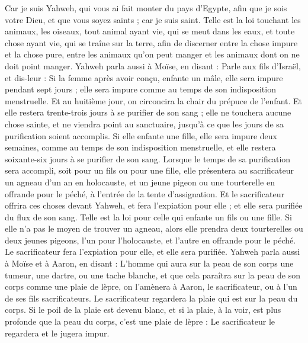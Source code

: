 \begin{multicols}{2}
Car je suis Yahweh, qui vous ai fait monter du pays d'Egypte, afin que je sois votre Dieu, et que vous soyez saints ; car je suis saint.
Telle est la loi touchant les animaux, les oiseaux, tout animal ayant vie, qui se meut dans les eaux, et toute chose ayant vie, qui se traîne sur la terre,
afin de discerner entre la chose impure et la chose pure, entre les animaux qu'on peut manger et les animaux dont on ne doit point manger.
\VerseOne{}Yahweh parla aussi à Moïse, en disant :
Parle aux fils d'Israël, et dis-leur : Si la femme après avoir conçu, enfante un mâle, elle sera impure pendant sept jours ; elle sera impure comme au temps de son indisposition menstruelle.
Et au huitième jour, on circoncira la chair du prépuce de l'enfant.
Et elle restera trente-trois jours à se purifier de son sang ; elle ne touchera aucune chose sainte, et ne viendra point au sanctuaire, jusqu'à ce que les jours de sa purification soient accomplis.
Si elle enfante une fille, elle sera impure deux semaines, comme au temps de son  indisposition menstruelle, et elle restera soixante-six jours à se purifier de son sang.
Lorsque le temps de sa purification sera accompli, soit pour un fils ou pour une fille, elle présentera au sacrificateur un agneau d'un an en holocauste, et un jeune pigeon ou une tourterelle en offrande pour le péché, à l'entrée de la tente d'assignation.
Et le sacrificateur offrira ces choses devant Yahweh, et fera l’expiation pour elle ; et elle sera purifiée du flux de son sang. Telle est la loi pour celle qui enfante un fils ou une fille.
Si elle n'a pas le moyen de trouver un agneau, alors elle prendra deux tourterelles ou deux jeunes pigeons, l'un pour l'holocauste, et l'autre en offrande pour le péché. Le sacrificateur fera l’expiation pour elle, et elle sera purifiée.
\VerseOne{}Yahweh parla aussi à Moïse et à Aaron, en disant :
L'homme qui aura sur la peau de son corps une tumeur, une dartre, ou une tache blanche, et que cela paraîtra sur la peau de son corps comme une plaie de lèpre, on l'amènera à Aaron, le sacrificateur, ou à l’un de ses fils sacrificateurs.
Le sacrificateur regardera la plaie qui est sur la peau du corps. Si le poil de la plaie est devenu blanc, et si la plaie, à la voir, est plus profonde que la peau du corps, c'est une plaie de lèpre : Le sacrificateur le regardera et le jugera impur.

\end{multicols}
